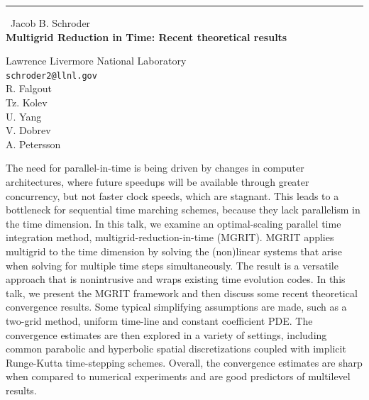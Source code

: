 \documentclass{report}
\begin{document}
\begin{center}
\rule{6in}{1pt} \
{\large Jacob B. Schroder \\
{\bf Multigrid Reduction in Time: Recent theoretical results}}

Lawrence Livermore National Laboratory
\\
{\tt schroder2@llnl.gov}\\
R. Falgout\\
Tz. Kolev\\
U. Yang\\
V. Dobrev\\
A. Petersson\end{center}

The need for parallel-in-time is being driven by changes in computer
architectures, where future speedups will be available through greater
concurrency, but not faster clock speeds, which are stagnant. This leads
to a bottleneck for sequential time marching schemes, because they lack
parallelism in the time dimension. In this talk, we examine an
optimal-scaling parallel time integration method,
multigrid-reduction-in-time (MGRIT). MGRIT applies multigrid to the time
dimension by solving the (non)linear systems that arise when solving for
multiple time steps simultaneously. The result is a versatile approach
that is nonintrusive and wraps existing time evolution codes. In this
talk, we present the MGRIT framework and then discuss some recent
theoretical convergence results. Some typical simplifying assumptions are
made, such as a two-grid method, uniform time-line and constant
coefficient PDE. The convergence estimates are then explored in a variety
of settings, including common parabolic and hyperbolic spatial
discretizations coupled with implicit Runge-Kutta time-stepping schemes.
Overall, the convergence estimates are sharp when compared to numerical
experiments and are good predictors of multilevel results.
\end{document}
